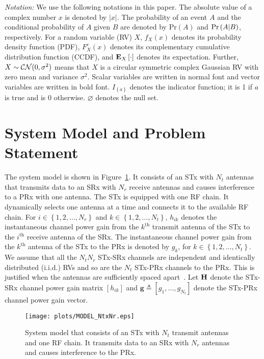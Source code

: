 \documentclass[12pt,draftcls,peerreview,onecolumn]{IEEEtran}
\newcommand{\brac}[1]{\left({#1}\right)}
\newcommand{\cbrac}[1]{\left\{{#1}\right\}}
\newcommand{\indic}[1]{I_{\cbrac{#1}}}
\newcommand{\define}{\triangleq}
\newcommand{\mtx}[1]{{\bf #1}} %
\newcommand{\explow}[2]{{\bf{E}}_{#1}\left[{#2}\right]}
\newcommand{\prob}[1]{\text{Pr}\brac{#1}}
\newcommand{\given}{\arrowvert}
\newcommand{\Nt}{{N_t}}
\newcommand{\Nr}{{N_r}}
\newcommand{\such}{h}
\newcommand{\puch}{g}
\newcommand{\hk}[1]{{\such_{#1}}}
\newcommand{\gk}[1]{{\puch_{#1}}}
\newcommand{\g}{\mathbf{\puch}}
\newcommand{\antopts}{\left\{1,2,\ldots,\Nt\right\}}
\newcommand{\nropts}{\left\{1,2,\ldots,\Nr\right\}}
\newcommand{\Hmx}{\mtx{H}}
\newcommand{\ith}{i^{\text{th}}}
\newcommand{\kth}{k^{\text{th}}}
\newcommand{\nullset}{\varnothing}
\begin{document}
\emph{Notation:} We use the following notations in this paper. The absolute value of a complex number $x$ is denoted by $|x|$. The probability of an event $A$ and the conditional probability of $A$ given $B$ are denoted by $\prob{A}$ and $\prob{A \given B}$, respectively. For a random variable (RV) $X$, $f_{X}(x)$ denotes its probability density function (PDF), $F_{X}^{c}(x)$ denotes its complementary cumulative distribution function (CCDF), and $\explow{X}{\cdot}$ denotes its expectation. Further, $X \sim {\cal CN}(0,\sigma^2)$ means that $X$ is a circular symmetric complex Gaussian RV with zero mean and variance $\sigma^2$.  Scalar variables are written in normal font and vector variables are written in bold font. $\indic{a}$ denotes the indicator function; it is 1 if $a$ is true and is 0 otherwise. $\nullset$ denotes the null set.

\section{System Model and Problem Statement}
\label{sec:model}
The system model is shown in Figure~\ref{fig:MODEL}. It consists of an STx with $\Nt$ antennas that transmits data to an SRx with $\Nr$ receive antennas and causes interference to a PRx with one antenna. The STx is equipped with one RF chain. It dynamically selects one antenna at a time and connects it to the available RF chain. For $i \in \nropts$ and $k \in \antopts$, $\hk{ik}$ denotes the instantaneous channel power gain from the $\kth$ transmit antenna of the STx to the $\ith$ receive antenna of the SRx. The instantaneous channel power gain from the $\kth$ antenna of the STx to the PRx is denoted by $\gk{k}$, for $k \in \antopts$. We assume that all the $\Nt\Nr$ STx-SRx channels are independent and identically distributed (i.i.d.) RVs and so are the $\Nt$ STx-PRx channels to the PRx. This is justified when the antennas are sufficiently spaced apart~\cite{Fakhan_2014_TSP,Kong_2011_JCN,Sarvendranath_2013_TCOM,Hanif_2015_globecom}. Let $\Hmx$ denote the STx-SRx channel power gain matrix $\left[\hk{ik}\right]$ and $\g\define\left[\gk{1},\ldots,\gk{\Nt}\right]$ denote the STx-PRx channel power gain vector.

\begin{figure}
\centering 
\texttt{[image: plots/MODEL\_NtxNr.eps]}
\caption{System model that consists of an STx with $\Nt$ transmit antennas and one RF chain. It transmits data to an SRx with $\Nr$ antennas and causes interference to the PRx.}
\label{fig:MODEL}
\end{figure}
\newcommand{\hs}{\mathbf{\such}_{s}}
\newcommand{\hsstar}{\mathbf{\such}_{s^{*}}}
\end{document}
